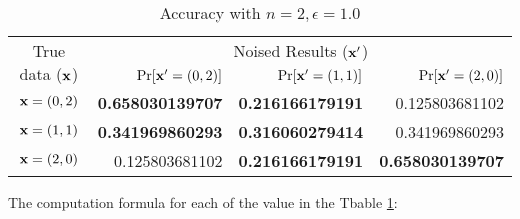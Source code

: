 \documentclass{article}
\begin{document}
\begin{table}[htbp]
	\centering
	\caption{Accuracy with $n = 2, \epsilon = 1.0$}
	\label{tab_n2prob}
\begin{tabular}{|c||r|r|r|}
	\hline

	\multirow{2}{*}{True data ($\textbf{x}$)} 	
								& \multicolumn{3}{c|}{Noised Results ($\textbf{x}'$)}  		
								\\ \cline{2-4}
	                      		&  $\Pr[\textbf{x}' = (0, 2)]$  	
	                      		&  $\Pr[\textbf{x}' = (1, 1)]$ 	
	                      		&  $\Pr[\textbf{x}' = (2, 0)]$ 	\\  \hline \hline
	$\textbf{x} = (0,2)$          & {\bf 0.658030139707}	
								& {\bf 0.216166179191}	
								& 0.125803681102 
								\\  \hline
	$\textbf{x} = (1,1)$          & {\bf 0.341969860293}	
								& {\bf 0.316060279414} 			
								& 0.341969860293
								\\  \hline
	$\textbf{x} = (2,0)$          & 0.125803681102
								& {\bf 0.216166179191} 			
								& {\bf 0.658030139707}
								\\  \hline
\end{tabular}
\end{table}


The computation formula for each of the value in the Tbable \ref{tab_n2prob}:
\end{document}
